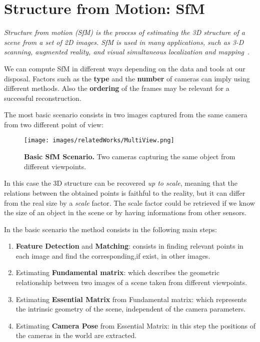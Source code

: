 \section{Structure from Motion: SfM}
\textit{Structure from motion (SfM) is the process of estimating the 3D
structure of a scene from a set of 2D images. SfM is used in many
applications, such as 3-D scanning, augmented reality, and visual
simultaneous localization and mapping}~\cite{sfm_matlab}.

We can compute SfM in different ways depending on the data and tools at our disposal.
Factors such as the \textbf{type} and the \textbf{number} of cameras can imply using different methods. Also 
the \textbf{ordering} of the frames may be relevant for a successful reconstruction.

The most basic scenario consists in two images captured from the same camera from two different point of view:
\begin{figure}[H]
    \centering
    \texttt{[image: images/relatedWorks/MultiView.png]} 
    \caption{\textbf{Basic SfM Scenario.} Two cameras capturing the same object from different viewpoints.}
    \label{fig:sfm_basic}
\end{figure}
 In this case the 3D structure can be recovered \textit{up to scale}, meaning that the relations between the obtained
 points is faithful to the reality, but it can differ from the real size by a \textit{scale} factor. The scale factor
 could be retrieved if we know the size of an object in the scene or by having informations from other sensors.

 In the basic scenario the method consists in the following main steps:
 \begin{enumerate}
    \item \textbf{Feature Detection} and \textbf{Matching}: consists in finding relevant points in each image and find the corresponding,if exist, in other images.
    \item Estimating \textbf{Fundamental matrix}: which describes the geometric relationship between two images of a scene taken from different viewpoints. 
    \item Estimating \textbf{Essential Matrix} from Fundamental matrix: which represents the intrinsic geometry of the scene, independent of the camera parameters.
    \item Estimating \textbf{Camera Pose} from Essential Matrix: in this step the positions of the cameras in the world are extracted.
 \end{enumerate}


